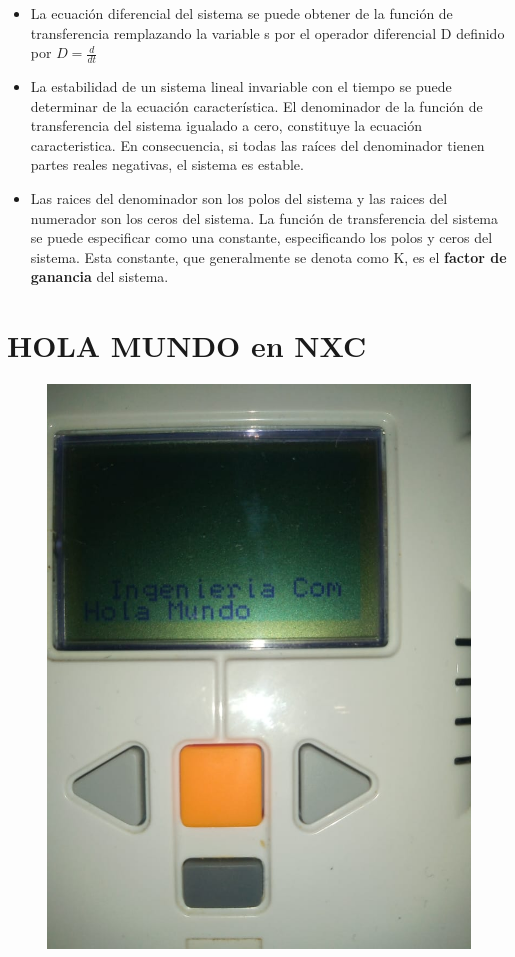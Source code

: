 \documentclass[
	12pt, %
]{fphw}
\begin{document}
{\begin{itemize}
\item La ecuación diferencial del sistema se puede obtener de la función de transferencia remplazando la variable s por el operador diferencial D definido por $D=\frac{d}{dt}$ 
\item La estabilidad de un sistema lineal invariable con el tiempo se puede determinar de la ecuación característica. El denominador de la función de transferencia del sistema igualado a cero, constituye la ecuación caracteristica. En consecuencia, si todas las raíces del denominador tienen partes reales negativas, el sistema es estable.
\item Las raices del denominador son los polos del sistema y las raices del numerador son los ceros del sistema. La función de transferencia del sistema se puede especificar como una constante, especificando los polos y ceros del sistema. Esta constante, que generalmente se denota como K, es el \textbf{factor de ganancia} del sistema. 
\end{itemize}
\newpage
\section*{{\color{RoyalPurple}HOLA MUNDO en NXC}}

\begin{figure}[H]
  \centering
  \includegraphics[scale=0.3]{images/luis_code.jpeg}
\end{figure}

}
\end{document}
